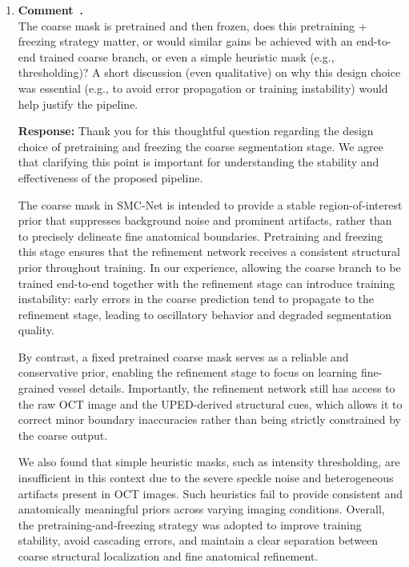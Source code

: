 \documentclass[11pt]{article}
\newcommand{\commentresponse}[2]{{\color{blue}\textbf{Response:} #2}}
\newcommand{\commentitem}{\item \textbf{Comment~\arabic{enumi}.}\\\ignorespaces}
\begin{document}
\begin{enumerate}
{    In addition, the coarse-to-fine design together with the joint constraint strategy encourages consistency between global structural cues and fine-grained segmentation. While the specific anatomical constraint differs across tasks, the underlying principle is transferable and can be adapted to other OCT settings by redefining the relevant anatomical prior (e.g., enforcing that fluids lie within retinal layers or that drusen reside beneath the RPE).

    Overall, the strong performance on RETOUCH suggests that SMC-Net captures task-agnostic structural regularities. Its key components, including UPED, SSSD, and the joint constraint mechanism, can therefore be reused for other OCT segmentation tasks with task-specific anatomical definitions.
    }

    \commentitem The coarse mask is pretrained and then frozen, does this pretraining + freezing strategy matter, or would similar gains be achieved with an end-to-end trained coarse branch, or even a simple heuristic mask (e.g., thresholding)? A short discussion (even qualitative) on why this design choice was essential (e.g., to avoid error propagation or training instability) would help justify the pipeline.
    
    \commentresponse{5}{
    Thank you for this thoughtful question regarding the design choice of pretraining and freezing the coarse segmentation stage. We agree that clarifying this point is important for understanding the stability and effectiveness of the proposed pipeline.

    The coarse mask in SMC-Net is intended to provide a stable region-of-interest prior that suppresses background noise and prominent artifacts, rather than to precisely delineate fine anatomical boundaries. Pretraining and freezing this stage ensures that the refinement network receives a consistent structural prior throughout training. In our experience, allowing the coarse branch to be trained end-to-end together with the refinement stage can introduce training instability: early errors in the coarse prediction tend to propagate to the refinement stage, leading to oscillatory behavior and degraded segmentation quality.

    By contrast, a fixed pretrained coarse mask serves as a reliable and conservative prior, enabling the refinement stage to focus on learning fine-grained vessel details. Importantly, the refinement network still has access to the raw OCT image and the UPED-derived structural cues, which allows it to correct minor boundary inaccuracies rather than being strictly constrained by the coarse output.

    We also found that simple heuristic masks, such as intensity thresholding, are insufficient in this context due to the severe speckle noise and heterogeneous artifacts present in OCT images. Such heuristics fail to provide consistent and anatomically meaningful priors across varying imaging conditions. Overall, the pretraining-and-freezing strategy was adopted to improve training stability, avoid cascading errors, and maintain a clear separation between coarse structural localization and fine anatomical refinement.
    }
\end{enumerate}
\end{document}
